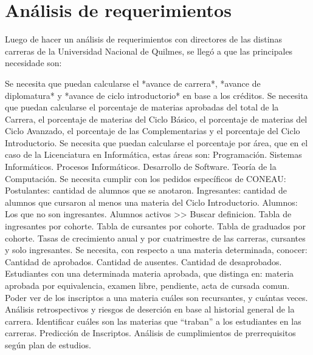 \section[Análisis de requerimientos]{Análisis de requerimientos}

Luego de hacer un análisis de requerimientos con directores de las distinas carreras de la Universidad Nacional de Quilmes, se llegó a que las principales necesidade son:

\begin{outline}
    \1 Se necesita que puedan calcularse el *avance de carrera*, *avance de diplomatura* y *avance de ciclo introductorio* en base a los créditos.
    \1 Se necesita que puedan calcularse el porcentaje de materias aprobadas del total de la Carrera, el porcentaje de materias del Ciclo Básico, el porcentaje de materias del Ciclo Avanzado, el porcentaje de las Complementarias y el porcentaje del Ciclo Introductorio.
    \1 Se necesita que puedan calcularse el porcentaje por área, que en el caso de la Licenciatura en Informática, estas áreas son: 
        \2 Programación.
        \2 Sistemas Informáticos.
        \2 Procesos Informáticos.
        \2 Desarrollo de Software.
        \2 Teoría de la Computación.
    \1 Se necesita cumplir con los pedidos específicos de CONEAU:
        \2 Postulantes: cantidad de alumnos que se anotaron.
        \2 Ingresantes: cantidad de alumnos que cursaron al menos una materia del Ciclo Introductorio.
        \2 Alumnos: Los que no son ingresantes. Alumnos activos >> Buscar definicion.
        \2 Tabla de ingresantes por cohorte.
        \2 Tabla de cursantes por cohorte.
        \2 Tabla de graduados por cohorte.
        \2 Tasas de crecimiento anual y por cuatrimestre de las carreras, cursantes y solo ingresantes.
    \1 Se necesita, con respecto a una materia determinada, conocer:
        \2 Cantidad de aprobados.
        \2 Cantidad de ausentes.
        \2 Cantidad de desaprobados.
    \1 Estudiantes con una determinada materia aprobada, que distinga en: materia aprobada por equivalencia, examen libre, pendiente, acta de cursada comun.
    \1 Poder ver de los inscriptos a una materia cuáles son recursantes, y cuántas veces.
    \1 Análisis retrospectivos y riesgos de deserción en base al historial general de la carrera.
    \1 Identificar cuáles son las materias que “traban” a los estudiantes en las carreras. 
    \1 Predicción de Inscriptos.
    \1 Análisis de cumplimientos de prerrequisitos según plan de estudios.
    
    
        
\end{outline}

